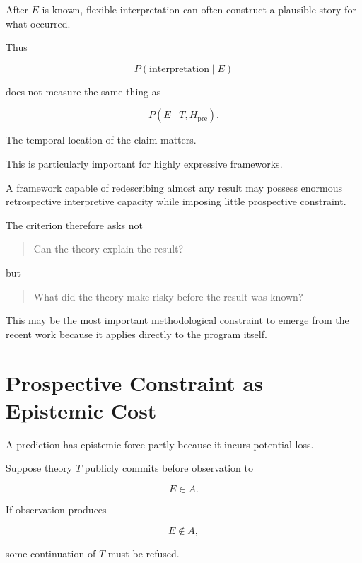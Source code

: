 \documentclass[11pt]{article}
\theoremstyle{remark}
\begin{document}
After $E$ is known, flexible interpretation can often construct a plausible
story for what occurred.

Thus

\begin{equation}
P(\text{interpretation}\mid E)
\end{equation}

does not measure the same thing as

\begin{equation}
P(E\mid T,H_{\mathrm{pre}}).
\end{equation}

The temporal location of the claim matters.

This is particularly important for highly expressive frameworks.

A framework capable of redescribing almost any result may possess enormous
retrospective interpretive capacity while imposing little prospective
constraint.

The criterion therefore asks not

\begin{quote}
Can the theory explain the result?
\end{quote}

but

\begin{quote}
What did the theory make risky before the result was known?
\end{quote}

This may be the most important methodological constraint to emerge from the
recent work because it applies directly to the program itself.

\section{Prospective Constraint as Epistemic Cost}

A prediction has epistemic force partly because it incurs potential loss.

Suppose theory $T$ publicly commits before observation to

\begin{equation}
E\in A.
\end{equation}

If observation produces

\begin{equation}
E\notin A,
\end{equation}

some continuation of $T$ must be refused.
\end{document}
